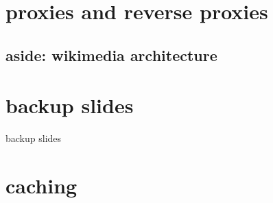 \section{proxies and reverse proxies}


\subsection{aside: wikimedia architecture}




\section{backup slides}
\begin{frame}{backup slides}
\end{frame}
\section{caching}



